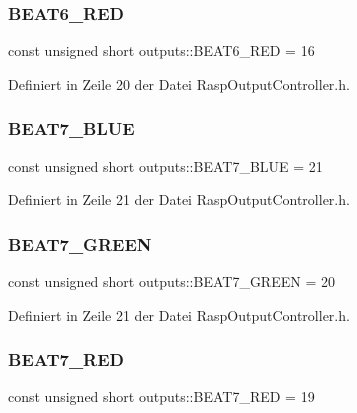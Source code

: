 \subsubsection{\texorpdfstring{B\+E\+A\+T6\+\_\+\+R\+ED}{BEAT6\_RED}}
{\footnotesize\ttfamily const unsigned short outputs\+::\+B\+E\+A\+T6\+\_\+\+R\+ED = 16}



Definiert in Zeile 20 der Datei Rasp\+Output\+Controller.\+h.

\mbox{\label{namespaceoutputs_a7051f5db20e6f0c0dc7dad8775d21b1f}} 
\subsubsection{\texorpdfstring{B\+E\+A\+T7\+\_\+\+B\+L\+UE}{BEAT7\_BLUE}}
{\footnotesize\ttfamily const unsigned short outputs\+::\+B\+E\+A\+T7\+\_\+\+B\+L\+UE = 21}



Definiert in Zeile 21 der Datei Rasp\+Output\+Controller.\+h.

\mbox{\label{namespaceoutputs_a971ea0c6742c83be5634cbf533cfb050}} 
\subsubsection{\texorpdfstring{B\+E\+A\+T7\+\_\+\+G\+R\+E\+EN}{BEAT7\_GREEN}}
{\footnotesize\ttfamily const unsigned short outputs\+::\+B\+E\+A\+T7\+\_\+\+G\+R\+E\+EN = 20}



Definiert in Zeile 21 der Datei Rasp\+Output\+Controller.\+h.

\mbox{\label{namespaceoutputs_a88730a5804ff8785e2fb07a1957a243c}} 
\subsubsection{\texorpdfstring{B\+E\+A\+T7\+\_\+\+R\+ED}{BEAT7\_RED}}
{\footnotesize\ttfamily const unsigned short outputs\+::\+B\+E\+A\+T7\+\_\+\+R\+ED = 19}



